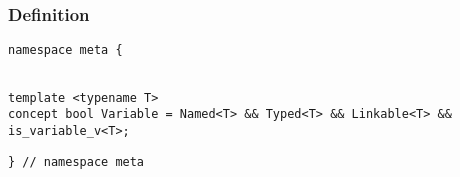 
\subsubsection{Definition}

\begin{verbatim}
namespace meta {
\end{verbatim}
\begin{verbatim}

template <typename T>
concept bool Variable = Named<T> && Typed<T> && Linkable<T> && is_variable_v<T>;

\end{verbatim}
\begin{verbatim}
} // namespace meta
\end{verbatim}
